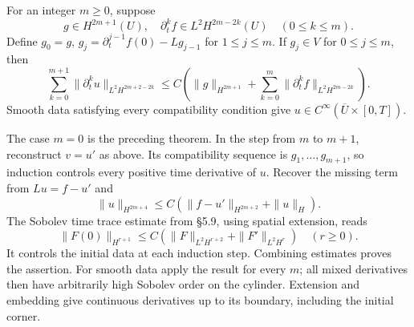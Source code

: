 \Needspace{55mm}
\begin{theorem}
\label{thm:7-parabolic-higher}
For an integer $m\geq0$, suppose
\[
 g\in H^{2m+1}(U),\quad
 \partial_t^kf\in L^2H^{2m-2k}(U)\quad(0\leq k\leq m).
\]
Define $g_0=g$, $g_j=\partial_t^{j-1}f(0)-Lg_{j-1}$ for $1\leq j\leq m$.
If $g_j\in V$ for $0\leq j\leq m$, then
\begin{equation}\label{eq:7-parabolic-higher}
 \sum_{k=0}^{m+1}\|\partial_t^ku\|_{L^2H^{2m+2-2k}}
 \leq C\left(\|g\|_{H^{2m+1}}+
 \sum_{k=0}^{m}\|\partial_t^kf\|_{L^2H^{2m-2k}}\right).
\end{equation}
Smooth data satisfying every compatibility condition give
$u\in C^\infty(\overline U\times[0,T])$.
\end{theorem}
\begin{expandedproof}
The case $m=0$ is the preceding theorem. In the step from $m$ to $m+1$,
reconstruct $v=u'$ as above. Its compatibility sequence is
$g_1,\ldots,g_{m+1}$, so induction controls every positive time derivative
of $u$. Recover the missing term from $Lu=f-u'$ and
\[
 \|u\|_{H^{2m+4}}\leq C(\|f-u'\|_{H^{2m+2}}+\|u\|_H).
\]
The Sobolev time trace estimate from \S5.9, using spatial
extension, reads
\[
 \|F(0)\|_{H^{r+1}}\leq
 C(\|F\|_{L^2H^{r+2}}+\|F'\|_{L^2H^r})\quad(r\geq0).
\]
It controls the initial data at each induction step. Combining estimates
proves the assertion. For smooth data apply the result for every $m$;
all mixed derivatives then have arbitrarily high Sobolev order on the
cylinder. Extension and embedding give continuous derivatives up to its
boundary, including the initial corner.
\end{expandedproof}
\Needspace{55mm}

\Needspace{55mm}
